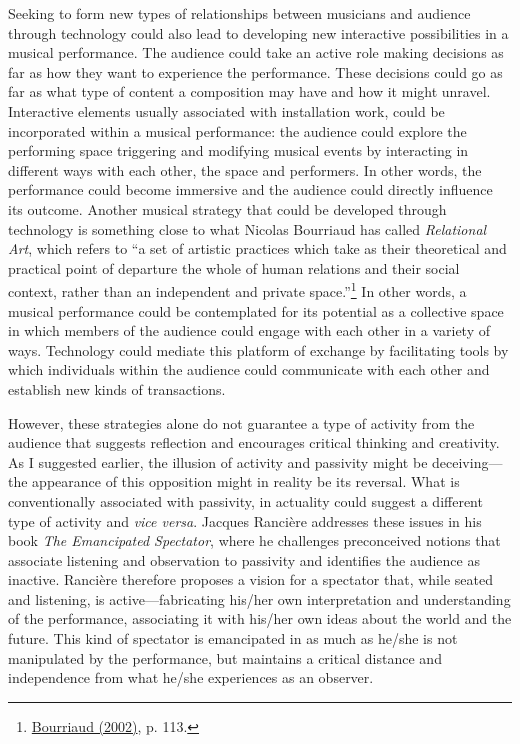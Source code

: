 Seeking to form new types of relationships between musicians and audience through technology could also lead to developing new interactive possibilities in a musical performance. The audience could take an active role making decisions as far as how they want to experience the performance. These decisions could go as far as what type of content a composition may have and how it might unravel. Interactive elements usually associated with installation work, could be incorporated within a musical performance: the audience could explore the performing space triggering and modifying musical events by interacting in different ways with each other, the space and performers. In other words, the performance could become immersive and the audience could directly influence its outcome. Another musical strategy that could be developed through technology is something close to what Nicolas Bourriaud has called \emph{Relational Art}, which refers to ``a set of artistic practices which take as their theoretical and practical point of departure the whole of human relations and their social context, rather than an independent and private space.''\footnote{\hyperlink{relational}{Bourriaud (2002)}, p. 113.} In other words, a musical performance could be contemplated for its potential as a collective space in which members of the audience could engage with each other in a variety of ways. 
Technology could mediate this platform of exchange by facilitating tools by which individuals within the audience could communicate with each other and establish new kinds of transactions.

However, these strategies alone do not guarantee a type of activity from the audience that suggests reflection and encourages critical thinking and creativity. As I suggested earlier, the illusion of activity and passivity might be deceiving---the appearance of this opposition might in reality be its reversal. What is conventionally associated with passivity, in actuality could suggest a different type of activity and \emph{vice versa}. Jacques Ranci\`{e}re addresses these issues in his book \emph{The Emancipated Spectator}, where he challenges preconceived notions that associate listening and observation to passivity and identifies the audience as inactive. Ranci\`{e}re therefore proposes a vision for a spectator that, while seated and listening, is active---fabricating his/her own interpretation and understanding of the performance, associating it with his/her own ideas about the world and the future. This kind of spectator is emancipated in as much as he/she is not manipulated by the performance, but maintains a critical distance and independence from what he/she experiences as an observer.

